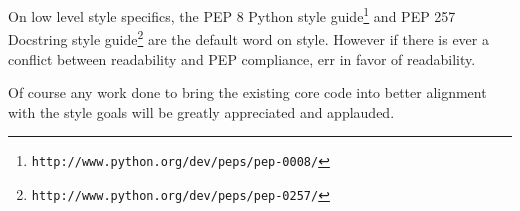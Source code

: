 On low level style specifics, the PEP 8 Python style guide\footnote{\texttt{http://www.python.org/dev/peps/pep-0008/}} and PEP 257 Docstring style guide\footnote{\texttt{http://www.python.org/dev/peps/pep-0257/}} are the default word on style. However if there is ever a conflict between readability and PEP compliance, err in favor of readability.

Of course any work done to bring the existing core code into better alignment with the style goals will be greatly appreciated and applauded.